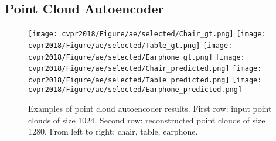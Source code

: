 \documentclass[10pt,twocolumn,letterpaper]{article}
\begin{document}
\subsection{Point Cloud Autoencoder} \label{sec_exp_ae}
\begin{figure}[h]
        \centering
        \texttt{[image: cvpr2018/Figure/ae/selected/Chair\_gt.png]}
        \texttt{[image: cvpr2018/Figure/ae/selected/Table\_gt.png]}
        \texttt{[image: cvpr2018/Figure/ae/selected/Earphone\_gt.png]}
        \texttt{[image: cvpr2018/Figure/ae/selected/Chair\_predicted.png]}
        \texttt{[image: cvpr2018/Figure/ae/selected/Table\_predicted.png]}
        \texttt{[image: cvpr2018/Figure/ae/selected/Earphone\_predicted.png]}
        \caption{Examples of point cloud autoencoder results. First row: input point clouds of size 1024. Second row: reconstructed point clouds of size 1280. From left to right: chair, table, earphone.}
        \label{fig_ae_selected}
        \vspace{-4pt}
\end{figure}
\end{document}
